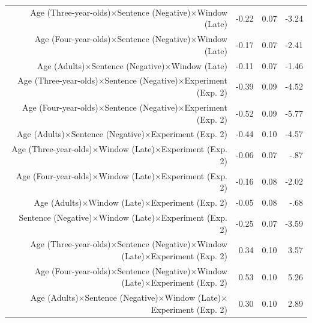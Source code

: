 \documentclass[man]{apa2}
\begin{document}
\begin{table}
\begin{center}
\begin{tabular}{rrrr}
  Age (Three-year-olds)$\times$Sentence (Negative)$\times$Window (Late) & -0.22 & 0.07 & -3.24 \\ 
  Age (Four-year-olds)$\times$Sentence (Negative)$\times$Window (Late)  & -0.17 & 0.07 & -2.41 \\ 
  Age (Adults)$\times$Sentence (Negative)$\times$Window (Late)  & -0.11 & 0.07 & -1.46 \\ 
  Age (Three-year-olds)$\times$Sentence (Negative)$\times$Experiment (Exp. 2)  & -0.39 & 0.09 & -4.52 \\ 
  Age (Four-year-olds)$\times$Sentence (Negative)$\times$Experiment (Exp. 2)  & -0.52 & 0.09 & -5.77 \\ 
  Age (Adults)$\times$Sentence (Negative)$\times$Experiment (Exp. 2) & -0.44 & 0.10 & -4.57 \\ 
  Age (Three-year-olds)$\times$Window (Late)$\times$Experiment (Exp. 2)  & -0.06 & 0.07 & -.87 \\ 
  Age (Four-year-olds)$\times$Window (Late)$\times$Experiment (Exp. 2)  & -0.16 & 0.08 & -2.02 \\ 
  Age (Adults)$\times$Window (Late)$\times$Experiment (Exp. 2)  & -0.05 & 0.08 & -.68 \\ 
 Sentence (Negative)$\times$Window (Late)$\times$Experiment (Exp. 2)  & -0.25 & 0.07 & -3.59 \\ 
  Age (Three-year-olds)$\times$Sentence (Negative)$\times$Window (Late)$\times$Experiment (Exp. 2)  & 0.34 & 0.10 & 3.57 \\ 
  Age (Four-year-olds)$\times$Sentence (Negative)$\times$Window (Late)$\times$Experiment (Exp. 2)  & 0.53 & 0.10 & 5.26 \\ 
  Age (Adults)$\times$Sentence (Negative)$\times$Window (Late)$\times$Experiment (Exp. 2) & 0.30 & 0.10 & 2.89 \\ 
   \hline
\end{tabular}
\end{center}
\end{table}
\doublespacing
\end{document}
